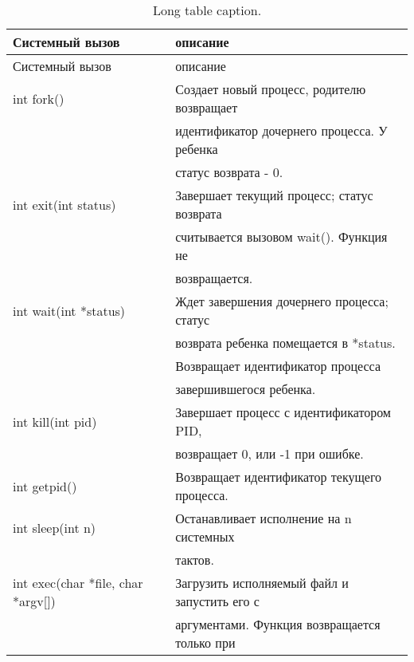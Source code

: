 \begin{longtable}[c]{l|l}
\caption{Long table caption.\label{long}}\\

\hline
Системный вызов & описание \\
\hline\hline
\endfirsthead

\hline
Системный вызов & описание \\
\hline
\endhead

\hline
\endfoot


int fork()                              & Создает новый процесс, родителю возвращает \\
                                        & идентификатор дочернего процесса. У ребенка \\
                                        & статус возврата - 0. \\
\hline
int exit(int status)                    & Завершает текущий процесс; статус возврата \\
                                        & считывается вызовом wait(). Функция не \\
                                        & возвращается. \\
\hline
int wait(int *status)                   & Ждет завершения дочернего процесса; статус \\
                                        & возврата ребенка помещается в *status. \\
                                        & Возвращает идентификатор процесса \\
                                        & завершившегося ребенка. \\
\hline
int kill(int pid)                       & Завершает процесс с идентификатором PID, \\
                                        & возвращает 0, или -1 при ошибке. \\
\hline
int getpid()                            & Возвращает идентификатор текущего процесса. \\
\hline
int sleep(int n)                        & Останавливает исполнение на n системных \\
                                        & тактов. \\
\hline
int exec(char *file, char *argv[])      & Загрузить исполняемый файл и запустить его с \\
                                        & аргументами. Функция возвращается только при \\

\end{longtable}
